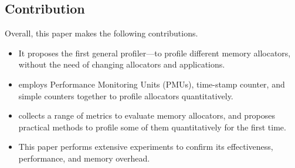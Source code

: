 
\subsection*{Contribution}

Overall, this paper makes the following contributions. 

\begin{itemize}
\item It proposes the first general profiler--\MP{}--to profile  different memory allocators, without the need of changing allocators and applications.  

\item \MP{} employs Performance Monitoring Units (PMUs), time-stamp counter, and simple counters together to profile allocators quantitatively. 

\item \MP{} collects a range of metrics to evaluate memory allocators, and proposes practical methods to profile some of them quantitatively for the first time. 
 
\item This paper performs extensive experiments to confirm its effectiveness, performance, and memory overhead.    

\end{itemize} 


